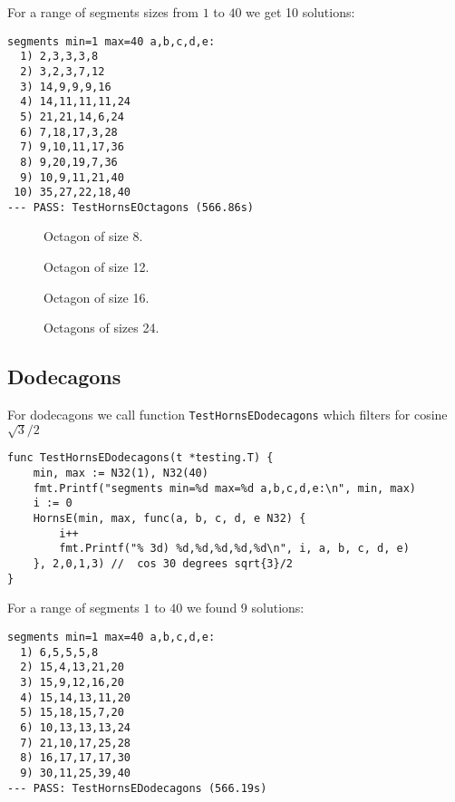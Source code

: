 \documentclass[11pt]{article}
\begin{document}
For a range of segments sizes from $1$ to $40$ we get 10 solutions:
\begin{lstlisting}
segments min=1 max=40 a,b,c,d,e:
  1) 2,3,3,3,8
  2) 3,2,3,7,12
  3) 14,9,9,9,16
  4) 14,11,11,11,24
  5) 21,21,14,6,24
  6) 7,18,17,3,28
  7) 9,10,11,17,36
  8) 9,20,19,7,36
  9) 10,9,11,21,40
 10) 35,27,22,18,40
--- PASS: TestHornsEOctagons (566.86s)
\end{lstlisting}

\setlength{\columnsep}{2pt}
\begin{multicols}{2}

\begin{figure}[H]
\centering
{}
\caption{Octagon of size 8.}
\end{figure}

\begin{figure}[H]
\centering
{}
\caption{Octagon of size 12.}
\end{figure}

\end{multicols}

\begin{figure}[H]
\centering
{}
\caption{Octagon of size 16.}
\end{figure}

\begin{figure}[H]
\centering
{}
\caption{Octagons of sizes 24.}
\end{figure}

\subsection{Dodecagons}

For dodecagons we call function \texttt{TestHornsEDodecagons} which filters for
cosine $\sqrt{3}/2$
\begin{lstlisting}
func TestHornsEDodecagons(t *testing.T) {
	min, max := N32(1), N32(40)
	fmt.Printf("segments min=%d max=%d a,b,c,d,e:\n", min, max)
	i := 0
	HornsE(min, max, func(a, b, c, d, e N32) {
		i++
		fmt.Printf("% 3d) %d,%d,%d,%d,%d\n", i, a, b, c, d, e)
	}, 2,0,1,3) //  cos 30 degrees sqrt{3}/2
}
\end{lstlisting}

For a range of segments $1$ to $40$ we found 9 solutions:
\begin{lstlisting}
segments min=1 max=40 a,b,c,d,e:
  1) 6,5,5,5,8
  2) 15,4,13,21,20
  3) 15,9,12,16,20
  4) 15,14,13,11,20
  5) 15,18,15,7,20
  6) 10,13,13,13,24
  7) 21,10,17,25,28
  8) 16,17,17,17,30
  9) 30,11,25,39,40
--- PASS: TestHornsEDodecagons (566.19s)
\end{lstlisting}
\end{document}
